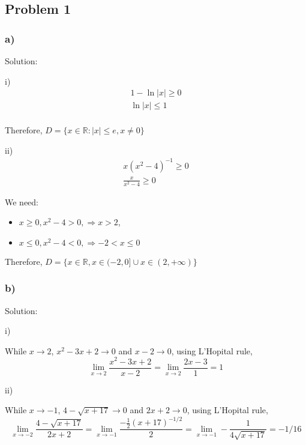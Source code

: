 \documentclass[letterpaper, 11pt]{article}
\newcommand{\1}{\mathds{1}}	%
\theoremstyle{definition}
\begin{document}
\subsection*{Problem 1}

\subsubsection*{a)} 
Solution:

i)
\begin{align*}
  1 - \ln|x| \geq 0 \\
  \ln|x| \leq 1 \\
\end{align*}

Therefore, $D = \{x \in \mathbb{R}: |x| \leq e, x \neq 0  \}$

ii)
\begin{align*}
  x(x^{2} - 4)^{-1} \geq 0 \\
  \frac{x}{x^2 - 4} \geq 0
\end{align*}

We need:
\begin{itemize}
  \item $x \geq 0, x^2 - 4 > 0,  \Rightarrow x > 2$,
  \item $x \leq 0, x^2 -4 < 0, \Rightarrow -2 < x \leq 0$
\end{itemize}

Therefore, $D = \{ x \in \mathbb{R}, x \in (-2, 0] \cup x \in (2, +\infty) \}$

\subsubsection*{b)}

Solution:

i)

While $x \to 2$, $x^2 - 3x + 2 \to 0$ and $x -2 \to 0 $, using L'Hopital rule, \begin{equation*}
  \lim_{x \to 2}\frac{x^2 - 3x + 2}{x - 2} = \lim_{x \to 2}\frac{2x-3}{1} = 1  
\end{equation*}

ii)

While $x \to -1$, $4 - \sqrt{x+17} \to 0$ and $2x+2 \to 0$, using L'Hopital rule, \begin{equation*}
  \lim_{x \to -2}\frac{4 - \sqrt{x+17}}{2x+2} =  \lim_{x \to -1}\frac{-\frac{1}{2}(x+17)^{-1/2}}{2} = \lim_{x \to -1}-\frac{1}{4 \sqrt{x+17}} = -1/16 
\end{equation*}
\end{document}
